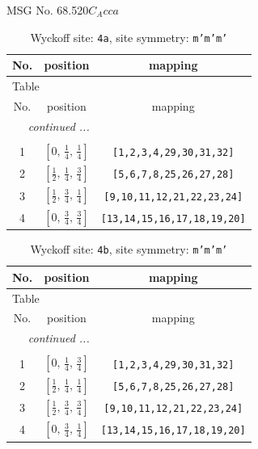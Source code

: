\documentclass[fleqn,8pt]{jsarticle}
\begin{document}
\setcounter{MaxMatrixCols}{32}

\renewcommand{\tablename}{Table~}
\renewcommand{\figurename}{Figure~}
\begin{center}
\LARGE
MSG No. 68.520\quad$C_{A}cca$
\end{center}
\renewcommand{\arraystretch}{1.2}
\begin{longtable}{ccc}
\caption{Wyckoff site: {\tt 4a}, site symmetry: {\tt m'm'm'}}
 \\
 \hline \hline
No. & position & mapping \\ \hline \endfirsthead

\multicolumn{2}{l}{\tablename\ \thetable{}} \\
 \hline \hline
No. & position & mapping \\ \hline \endhead

 \hline \hline
\multicolumn{2}{r}{\footnotesize\it continued ...} \\ \endfoot

 \hline \hline
\multicolumn{2}{r}{} \\ \endlastfoot

1 & $\left[ 0,\, \frac{1}{4},\, \frac{1}{4} \right]$ & {\tt [1,2,3,4,29,30,31,32]} \\ \hline
2 & $\left[ \frac{1}{2},\, \frac{1}{4},\, \frac{3}{4} \right]$ & {\tt [5,6,7,8,25,26,27,28]} \\ \hline
3 & $\left[ \frac{1}{2},\, \frac{3}{4},\, \frac{1}{4} \right]$ & {\tt [9,10,11,12,21,22,23,24]} \\ \hline
4 & $\left[ 0,\, \frac{3}{4},\, \frac{3}{4} \right]$ & {\tt [13,14,15,16,17,18,19,20]} \\
\end{longtable}
\renewcommand{\arraystretch}{1.2}
\begin{longtable}{ccc}
\caption{Wyckoff site: {\tt 4b}, site symmetry: {\tt m'm'm'}}
 \\
 \hline \hline
No. & position & mapping \\ \hline \endfirsthead

\multicolumn{2}{l}{\tablename\ \thetable{}} \\
 \hline \hline
No. & position & mapping \\ \hline \endhead

 \hline \hline
\multicolumn{2}{r}{\footnotesize\it continued ...} \\ \endfoot

 \hline \hline
\multicolumn{2}{r}{} \\ \endlastfoot

1 & $\left[ 0,\, \frac{1}{4},\, \frac{3}{4} \right]$ & {\tt [1,2,3,4,29,30,31,32]} \\ \hline
2 & $\left[ \frac{1}{2},\, \frac{1}{4},\, \frac{1}{4} \right]$ & {\tt [5,6,7,8,25,26,27,28]} \\ \hline
3 & $\left[ \frac{1}{2},\, \frac{3}{4},\, \frac{3}{4} \right]$ & {\tt [9,10,11,12,21,22,23,24]} \\ \hline
4 & $\left[ 0,\, \frac{3}{4},\, \frac{1}{4} \right]$ & {\tt [13,14,15,16,17,18,19,20]} \\
\end{longtable}
\end{document}
